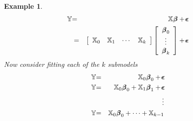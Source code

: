 \documentclass{article}
\newtheorem{example}[theorem]{Example}
\begin{document}
\bigskip

\begin{example}
\begin{eqnarray*}
\mathbb{Y} &\mathbb{=}&\mathbb{X}%
\beta\mkern-9.6mu \beta%
+%
\epsilon\mkern-10mu \epsilon
\\
&=&\left[ 
\begin{array}{cccc}
\mathbb{X}_{0} & \mathbb{X}_{1} & \cdots & \mathbb{X}_{k}%
\end{array}%
\right] \left[ 
\begin{array}{c}
\beta\mkern-9.6mu \beta%
_{0} \\ 
\vdots \\ 
\beta\mkern-9.6mu \beta%
_{k}%
\end{array}%
\right] +%
\epsilon\mkern-10mu \epsilon%
\end{eqnarray*}%
\newline
Now consider fitting each of the $k$ submodels%
\begin{eqnarray*}
\mathbb{Y} &\mathbb{=}&\mathbb{X}_{0}%
\beta\mkern-9.6mu \beta%
_{0}+%
\epsilon\mkern-10mu \epsilon
\\
\mathbb{Y} &\mathbb{=}&\mathbb{X}_{0}%
\beta\mkern-9.6mu \beta%
_{0}+\mathbb{X}_{1}%
\beta\mkern-9.6mu \beta%
_{1}+%
\epsilon\mkern-10mu \epsilon
\\
&&\vdots \\
\mathbb{Y} &\mathbb{=}&\mathbb{X}_{0}%
\beta\mkern-9.6mu \beta%
_{0}+\cdots +\mathbb{X}_{k-1}%

\end{eqnarray*}
\end{example}
\end{document}
